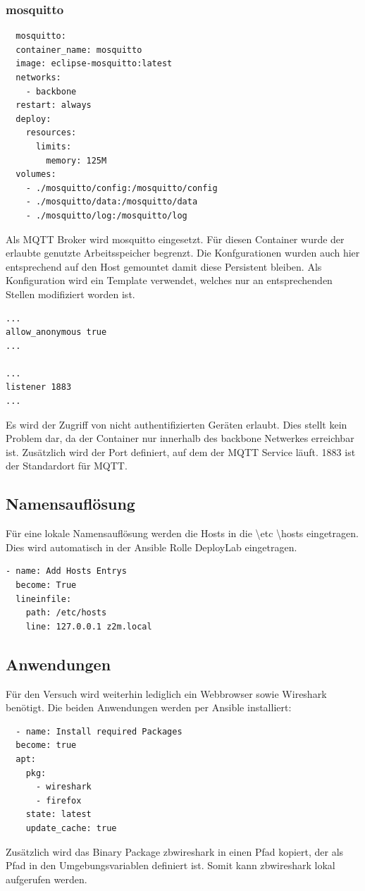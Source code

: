 \subsubsection{mosquitto}

\begin{lstlisting}
  mosquitto:
  container_name: mosquitto
  image: eclipse-mosquitto:latest
  networks:
    - backbone
  restart: always
  deploy:
    resources:
      limits:
        memory: 125M
  volumes:
    - ./mosquitto/config:/mosquitto/config
    - ./mosquitto/data:/mosquitto/data
    - ./mosquitto/log:/mosquitto/log
\end{lstlisting}

Als MQTT Broker wird \grqq mosquitto \grqq{} eingesetzt. Für diesen Container wurde der erlaubte genutzte Arbeitsspeicher begrenzt. Die Konfgurationen 
wurden auch hier entsprechend auf den Host gemountet damit diese Persistent bleiben. Als Konfiguration wird ein Template verwendet, welches nur an 
entsprechenden Stellen modifiziert worden ist.

\begin{lstlisting}
... 
allow_anonymous true
... 

... 
listener 1883
... 
\end{lstlisting}

Es wird der Zugriff von nicht authentifizierten Geräten erlaubt. Dies stellt kein Problem dar, da der Container nur innerhalb des \grqq backbone \grqq{} 
Netwerkes erreichbar ist. Zusätzlich wird der Port definiert, auf dem der MQTT Service läuft. 1883 ist der Standardort für MQTT.

\subsection{Namensauflösung}

Für eine lokale Namensauflösung werden die Hosts in die \grqq \textbackslash etc \textbackslash hosts \grqq{} eingetragen. Dies wird automatisch in der Ansible
Rolle \grqq DeployLab \grqq{} eingetragen.

\begin{lstlisting}
- name: Add Hosts Entrys
  become: True
  lineinfile:
    path: /etc/hosts
    line: 127.0.0.1 z2m.local
\end{lstlisting}

\subsection{Anwendungen}

Für den Versuch wird weiterhin lediglich ein Webbrowser sowie Wireshark benötigt. Die beiden Anwendungen werden per Ansible installiert:
\begin{lstlisting}
  - name: Install required Packages
  become: true
  apt:
    pkg:
      - wireshark
      - firefox
    state: latest
    update_cache: true
\end{lstlisting}

Zusätzlich wird das Binary Package \grqq zbwireshark \grqq in einen Pfad kopiert, der als Pfad in den Umgebungsvariablen definiert ist. Somit kann
\grqq zbwireshark \grqq{} lokal aufgerufen werden.
